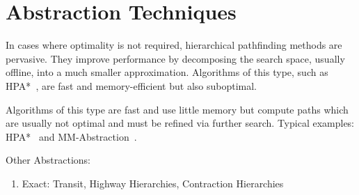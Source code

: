 \section{Abstraction Techniques}
\label{cha::lit::abstraction}
In cases where optimality is not required, hierarchical pathfinding methods
are pervasive.  They improve performance by decomposing the
search space, usually offline, into a much smaller approximation.  Algorithms
of this type, such as HPA*~\cite{botea04}, are  fast and
memory-efficient but also suboptimal.

Algorithms of this type are fast and use little memory but compute paths which are usually not
optimal and must be refined via further search. Typical examples: HPA*~\cite{botea04} and
MM-Abstraction~\cite{sturtevant07}.

Other Abstractions:
\begin{enumerate}
\item{Exact: Transit, Highway Hierarchies, Contraction Hierarchies}
\end{enumerate}

